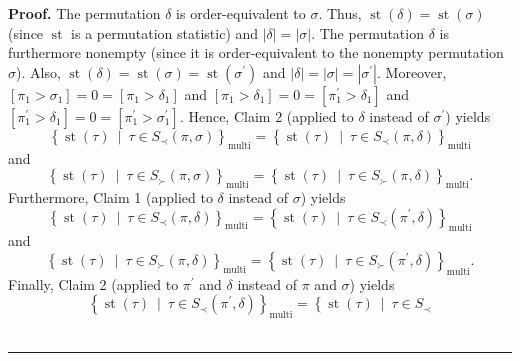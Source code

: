\documentclass[numbers=enddot,12pt,final,onecolumn,notitlepage]{scrartcl}%
\theoremstyle{definition}
\newenvironment{proof}[1][Proof]{\noindent\textbf{#1.} }{\ \rule{0.5em}{0.5em}}
\begin{document}
\begin{proof}
The permutation $\delta$ is order-equivalent to $\sigma$. Thus,
$\operatorname*{st}\left(  \delta\right)  =\operatorname*{st}\left(
\sigma\right)  $ (since $\operatorname*{st}$ is a permutation statistic) and
$\left\vert \delta\right\vert =\left\vert \sigma\right\vert $. The permutation
$\delta$ is furthermore nonempty (since it is order-equivalent to the nonempty
permutation $\sigma$). Also, $\operatorname*{st}\left(  \delta\right)
=\operatorname*{st}\left(  \sigma\right)  =\operatorname*{st}\left(
\sigma^{\prime}\right)  $ and $\left\vert \delta\right\vert =\left\vert
\sigma\right\vert =\left\vert \sigma^{\prime}\right\vert $. Moreover, $\left[
\pi_{1}>\sigma_{1}\right]  =0=\left[  \pi_{1}>\delta_{1}\right]  $ and
$\left[  \pi_{1}>\delta_{1}\right]  =0=\left[  \pi_{1}^{\prime}>\delta
_{1}\right]  $ and $\left[  \pi_{1}^{\prime}>\delta_{1}\right]  =0=\left[
\pi_{1}^{\prime}>\sigma_{1}^{\prime}\right]  $. Hence, Claim 2 (applied to
$\delta$ instead of $\sigma^{\prime}$) yields%
\[
\left\{  \operatorname*{st}\left(  \tau\right)  \ \mid\ \tau\in S_{\prec
}\left(  \pi,\sigma\right)  \right\}  _{\operatorname*{multi}}=\left\{
\operatorname*{st}\left(  \tau\right)  \ \mid\ \tau\in S_{\prec}\left(
\pi,\delta\right)  \right\}  _{\operatorname*{multi}}%
\]
and%
\begin{equation}
\left\{  \operatorname*{st}\left(  \tau\right)  \ \mid\ \tau\in S_{\succ
}\left(  \pi,\sigma\right)  \right\}  _{\operatorname*{multi}}=\left\{
\operatorname*{st}\left(  \tau\right)  \ \mid\ \tau\in S_{\succ}\left(
\pi,\delta\right)  \right\}  _{\operatorname*{multi}}.\nonumber
\end{equation}
Furthermore, Claim 1 (applied to $\delta$ instead of $\sigma$) yields%
\[
\left\{  \operatorname*{st}\left(  \tau\right)  \ \mid\ \tau\in S_{\prec
}\left(  \pi,\delta\right)  \right\}  _{\operatorname*{multi}}=\left\{
\operatorname*{st}\left(  \tau\right)  \ \mid\ \tau\in S_{\prec}\left(
\pi^{\prime},\delta\right)  \right\}  _{\operatorname*{multi}}%
\]
and%
\[
\left\{  \operatorname*{st}\left(  \tau\right)  \ \mid\ \tau\in S_{\succ
}\left(  \pi,\delta\right)  \right\}  _{\operatorname*{multi}}=\left\{
\operatorname*{st}\left(  \tau\right)  \ \mid\ \tau\in S_{\succ}\left(
\pi^{\prime},\delta\right)  \right\}  _{\operatorname*{multi}}.
\]
Finally, Claim 2 (applied to $\pi^{\prime}$ and $\delta$ instead of $\pi$ and
$\sigma$) yields%
\[
\left\{  \operatorname*{st}\left(  \tau\right)  \ \mid\ \tau\in S_{\prec
}\left(  \pi^{\prime},\delta\right)  \right\}  _{\operatorname*{multi}%
}=\left\{  \operatorname*{st}\left(  \tau\right)  \ \mid\ \tau\in S_{\prec
}\]
\end{proof}
\end{document}
